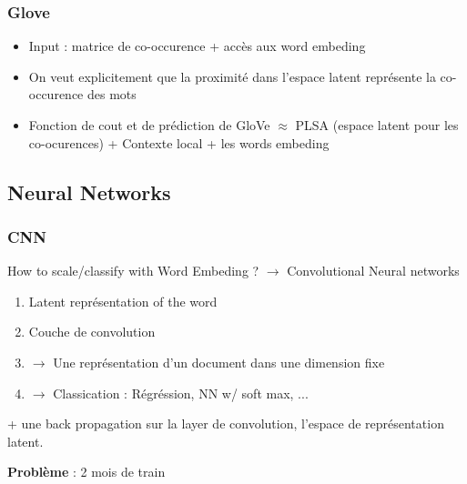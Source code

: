 \documentclass{article}
\begin{document}
\begin{multicols}{2}
    \subsubsection{Glove}
    \begin{itemize}
        \item Input : matrice de co-occurence + accès aux word embeding
        \item On veut explicitement que la proximité dans l'espace latent représente la co-occurence des mots
        \item Fonction de cout et de prédiction de GloVe $ \approx  $ PLSA (espace latent pour les co-ocurences) + Contexte local + les words embeding 
    \end{itemize}
    
    \subsection{Neural Networks}
    \subsubsection{CNN}
    How to scale/classify with Word Embeding ? $\rightarrow$ Convolutional Neural networks
    \begin{enumerate}
        \item Latent représentation of the word 
        \item Couche de convolution
        \item $\rightarrow$ Une représentation d'un document dans une dimension fixe
        \item $\rightarrow$ Classication : Régréssion, NN w/ soft max, ...
    \end{enumerate}
    + une back propagation sur la layer de convolution, l'espace de représentation latent. 
    
    \textbf{Problème} : 2 mois de train 
    

\end{multicols}
\end{document}
